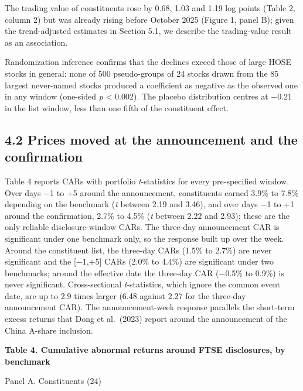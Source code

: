 \documentclass[review,authoryear,12pt]{elsarticle}
\begin{document}
The trading value of constituents rose by 0.68, 1.03 and 1.19 log points
(Table 2, column 2) but was already rising before October 2025 (Figure
1, panel B); given the trend-adjusted estimates in Section 5.1, we
describe the trading-value result as an association.

Randomization inference confirms that the declines exceed those of large
HOSE stocks in general: none of 500 pseudo-groups of 24 stocks drawn
from the 85 largest never-named stocks produced a coefficient as
negative as the observed one in any window (one-sided \emph{p}
\textless{} 0.002). The placebo distribution centres at −0.21 in the
list window, less than one fifth of the constituent effect.

\hypertarget{prices-moved-at-the-announcement-and-the-confirmation}{%
\subsection*{4.2 Prices moved at the announcement and the
confirmation}}

Table 4 reports CARs with portfolio \emph{t}-statistics for every
pre-specified window. Over days −1 to +5 around the announcement,
constituents earned 3.9\% to 7.8\% depending on the benchmark (\emph{t}
between 2.19 and 3.46), and over days −1 to +1 around the confirmation,
2.7\% to 4.5\% (\emph{t} between 2.22 and 2.93); these are the only
reliable disclosure-window CARs. The three-day announcement CAR is
significant under one benchmark only, so the response built up over the
week. Around the constituent list, the three-day CARs (1.5\% to 2.7\%)
are never significant and the {[}−1,+5{]} CARs (2.0\% to 4.4\%) are
significant under two benchmarks; around the effective date the
three-day CAR (−0.5\% to 0.9\%) is never significant. Cross-sectional
\emph{t}-statistics, which ignore the common event date, are up to 2.9
times larger (6.48 against 2.27 for the three-day announcement CAR). The
announcement-week response parallels the short-term excess returns that
Dong et al.~(2023) report around the announcement of the China A-share
inclusion.

\textbf{Table 4. Cumulative abnormal returns around FTSE disclosures, by
benchmark}

Panel A. Constituents (24)
\end{document}

